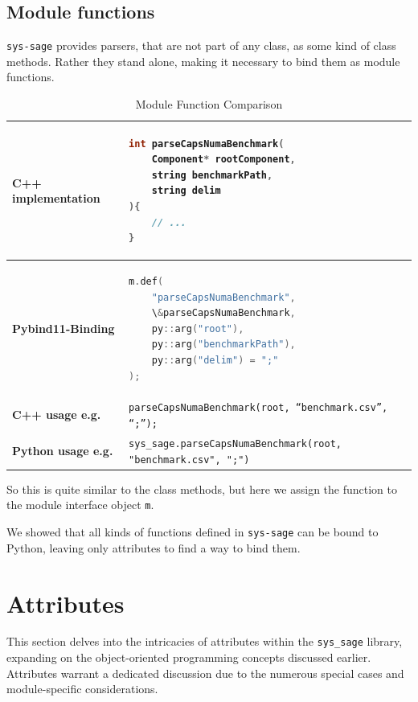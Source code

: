 \subsection{Module functions}

\texttt{sys-sage} provides parsers, that are not part of any class, as some kind of class methods. Rather they stand alone, making it necessary to bind them as module functions.

\begin{table}[htbp]
\centering
\begin{tabular}{|l|l|}
\hline
\textbf{C++ implementation} &
\begin{lstlisting}[language=C++]
int parseCapsNumaBenchmark(
    Component* rootComponent,
    string benchmarkPath,
    string delim
){
    // ...
}
\end{lstlisting}
\\ \hline
\textbf{Pybind11-Binding} &
\begin{lstlisting}[language=C++]
m.def(
    "parseCapsNumaBenchmark",
    \&parseCapsNumaBenchmark,
    py::arg("root"),
    py::arg("benchmarkPath"),
    py::arg("delim") = ";"
);
\end{lstlisting}
\\ \hline
\textbf{C++ usage e.g.} &
\verb|parseCapsNumaBenchmark(root, “benchmark.csv”, “;”);| \\ \hline
\textbf{Python usage e.g.} &
\verb|sys_sage.parseCapsNumaBenchmark(root, "benchmark.csv", ";")| \\ \hline
\end{tabular}
\caption{Module Function Comparison}
\label{tab:module_functions}
\end{table}

So this is quite similar to the class methods, but here we assign the function to the module interface object \verb|m|.\cite[see Reference/Conveneince Classes for specific Python types]{pybind11-docu}

\smallskip
We showed that all kinds of functions defined in \texttt{sys-sage} can be bound to Python, leaving only attributes to find a way to bind them.

\section{Attributes}

This section delves into the intricacies of attributes within the \verb|sys_sage| library, expanding on the object-oriented programming concepts discussed earlier. Attributes warrant a dedicated discussion due to the numerous special cases and module-specific considerations.

